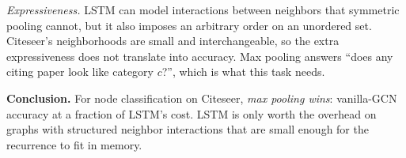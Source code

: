 \documentclass{article}
\begin{document}
\begin{tcolorbox}[colback=white, colframe=black!75, breakable, title=\textbf{Solution to Exercise 4}]
\emph{Expressiveness.} LSTM can model interactions between neighbors that symmetric pooling cannot, but it also imposes an arbitrary order on an unordered set. Citeseer's neighborhoods are small and interchangeable, so the extra expressiveness does not translate into accuracy. Max pooling answers ``does any citing paper look like category $c$?'', which is what this task needs.

\medskip
\textbf{Conclusion.} For node classification on Citeseer, \emph{max pooling wins}: vanilla-GCN accuracy at a fraction of LSTM's cost. LSTM is only worth the overhead on graphs with structured neighbor interactions that are small enough for the recurrence to fit in memory.
\end{tcolorbox}
\end{document}
